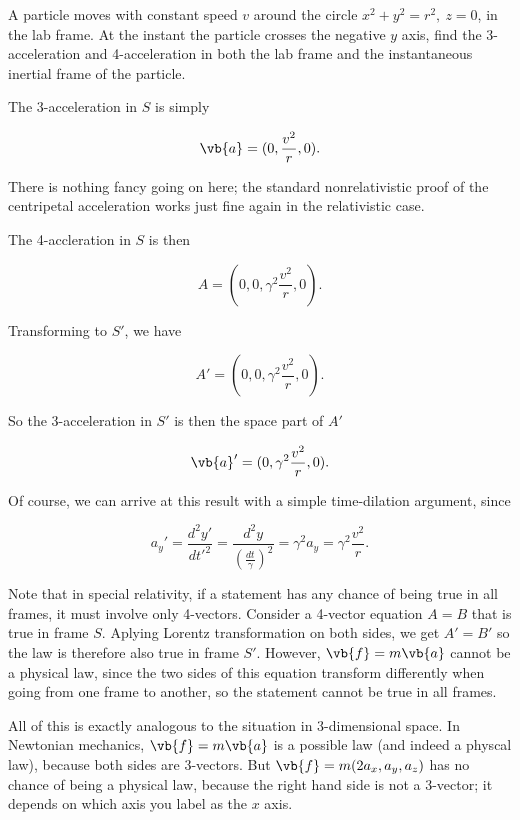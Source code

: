 \documentclass[english,a4paper,12pt]{report}
\begin{document}
{A particle moves with constant speed \(v\) around the circle \(x^2+y^2=r^2, ~z=0\), in the lab frame. At the instant the particle crosses the negative \(y\) axis, find the 3-acceleration and 4-acceleration in both the lab frame and the instantaneous inertial frame of the particle. }
{The 3-acceleration in \(S\) is simply

\begin{equation}
    \vb{a} = (0,\frac{v^2}{r}, 0 ).
\end{equation}

There is nothing fancy going on here; the standard nonrelativistic proof of the centripetal acceleration works just fine again in the relativistic case. 

The 4-accleration in \(S\) is then 

\begin{equation}
    A = (0,0,\gamma ^2\frac{v^2}{r}, 0 ).
\end{equation}

Transforming to \(S'\), we have 

\begin{equation}
    A' = (0,0, \gamma ^2 \frac{v^2}{r}, 0 ).
\end{equation}

So the 3-acceleration in \(S'\) is then the space part of \(A'\)

\begin{equation}
    \vb{a} ' = (0,\gamma ^2\frac{v^2}{r}, 0 ).
\end{equation}

Of course, we can arrive at this result with a simple time-dilation argument, since

\begin{equation}
    a_{y}' = \frac{d^2y'}{dt'^2} = \frac{d^2y}{(\frac{dt}{\gamma }) ^2} = \gamma ^2 a_{y} = \gamma ^2 \frac{v^2}{r}.     
\end{equation}
}

Note that in special relativity, if a statement has any chance of being true in all frames, it must involve only 4-vectors. Consider a 4-vector equation \(A = B\) that is true in frame \(S\). Aplying Lorentz transformation on both sides, we get \(A' = B'\) so the law is therefore also true in frame \(S'\). However, \(\vb{f} = m\vb{a} \) cannot be a physical law, since the two sides of this equation transform differently when going from one frame to another, so the statement cannot be true in all frames. 

All of this is exactly analogous to the situation in 3-dimensional space. In Newtonian mechanics, \(\vb{f}  = m\vb{a} \) is a possible law (and indeed a physcal law), because both sides are 3-vectors. But \(\vb{f} = m(2a_{x}, a_{y},a_{z})\) has no chance of being a physical law, because the right hand side is not a 3-vector; it depends on which axis you label as the \(x\) axis.
\end{document}
